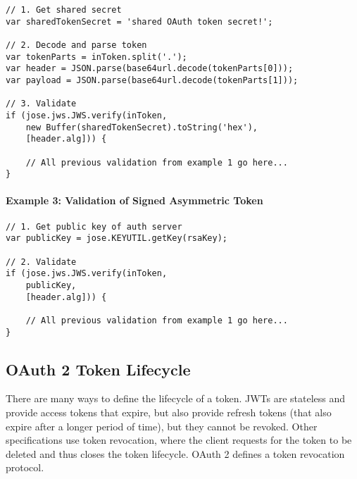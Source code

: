 \begin{verbatim}
// 1. Get shared secret
var sharedTokenSecret = 'shared OAuth token secret!';

// 2. Decode and parse token
var tokenParts = inToken.split('.');
var header = JSON.parse(base64url.decode(tokenParts[0]));
var payload = JSON.parse(base64url.decode(tokenParts[1]));

// 3. Validate
if (jose.jws.JWS.verify(inToken,
    new Buffer(sharedTokenSecret).toString('hex'), 
    [header.alg])) {
    
    // All previous validation from example 1 go here...
}
\end{verbatim}

\paragraph{Example 3: Validation of Signed Asymmetric Token}

\begin{verbatim}
// 1. Get public key of auth server
var publicKey = jose.KEYUTIL.getKey(rsaKey);

// 2. Validate
if (jose.jws.JWS.verify(inToken,
    publicKey,
    [header.alg])) {

    // All previous validation from example 1 go here...
}
\end{verbatim}

\subsection{OAuth 2 Token Lifecycle}

There are many ways to define the lifecycle of a token. JWTs are stateless and provide access tokens that expire, but also provide refresh tokens (that also expire after a longer period of time), but they cannot be revoked. Other specifications use token revocation, where the client requests for the token to be deleted and thus closes the token lifecycle. OAuth 2 defines a token revocation protocol.
